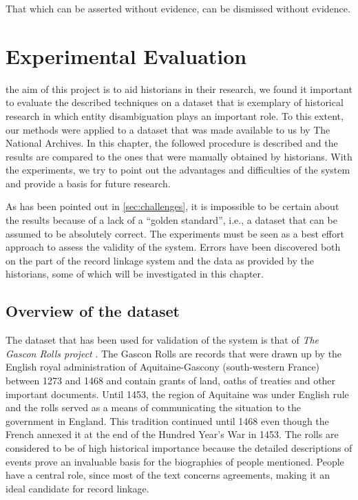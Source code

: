 \begin{savequote}[75mm] 
That which can be asserted without evidence, can be dismissed without evidence.
\end{savequote}




\chapter{Experimental Evaluation}
\label{ch:experiments}

 the aim of this project is to aid historians in their research, we found it important to evaluate the described techniques on a dataset that is exemplary of historical research in which entity disambiguation plays an important role.
To this extent, our methods were applied to a dataset that was made available to us by The National Archives.
In this chapter, the followed procedure is described and the results are compared to the ones that were manually obtained by historians.
With the experiments, we try to point out the advantages and difficulties of the system and provide a basis for future research.

As has been pointed out in \cref{sec:challenges}, it is impossible to be certain about the results because of a lack of a ``golden standard'', i.e., a dataset that can be assumed to be absolutely correct.
The experiments must be seen as a best effort approach to assess the validity of the system.
Errors have been discovered both on the part of the record linkage system and the data as provided by the historians, some of which will be investigated in this chapter.




\section{Overview of the dataset}
\label{sec:dataset}

The dataset that has been used for validation of the system is that of \emph{The Gascon Rolls project} \citep{GasconRolls}.
The Gascon Rolls are records that were drawn up by the English royal administration of Aquitaine-Gascony (south-western France) between 1273 and 1468 and contain grants of land, oaths of treaties and other important documents.
Until 1453, the region of Aquitaine was under English rule and the rolls served as a means of communicating the situation to the government in England.
This tradition continued until 1468 even though the French annexed it at the end of the Hundred Year's War in 1453.
The rolls are considered to be of high historical importance because the detailed
descriptions of events prove an invaluable basis for the biographies of people mentioned.
People have a central role, since most of the text concerns agreements, making it an ideal candidate for record linkage.

